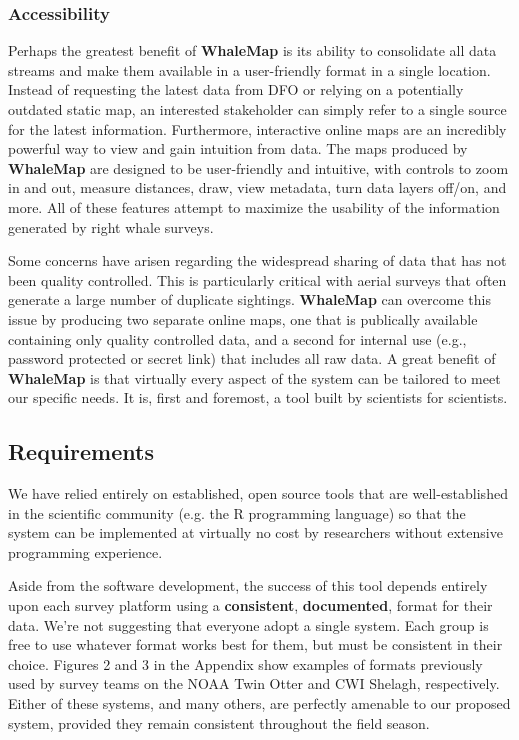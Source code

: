 \documentclass[11pt, letterpaper]{article}
\begin{document}
\subsubsection{Accessibility}

Perhaps the greatest benefit of \textbf{WhaleMap} is its ability to consolidate all data streams and make them available in a user-friendly format in a single location. Instead of requesting the latest data from DFO or relying on a potentially outdated static map, an interested stakeholder can simply refer to a single source for the latest information. Furthermore, interactive online maps are an incredibly powerful way to view and gain intuition from data. The maps produced by \textbf{WhaleMap} are designed to be user-friendly and intuitive, with controls to zoom in and out, measure distances, draw, view metadata, turn data layers off/on, and more. All of these features attempt to maximize the usability of the information generated by right whale surveys. 

Some concerns have arisen regarding the widespread sharing of data that has not been quality controlled. This is particularly critical with aerial surveys that often generate a large number of duplicate sightings. \textbf{WhaleMap} can overcome this issue by producing two separate online maps, one that is publically available containing only quality controlled data, and a second for internal use (e.g., password protected or secret link) that includes all raw data. A great benefit of \textbf{WhaleMap} is that virtually every aspect of the system can be tailored to meet our specific needs. It is, first and foremost, a tool built by scientists for scientists. 

\subsection{Requirements}

We have relied entirely on established, open source tools that are well-established in the scientific community (e.g. the R programming language) so that the system can be implemented at virtually no cost by researchers without extensive programming experience.

Aside from the software development, the success of this tool depends entirely upon each survey platform using a \textbf{consistent}, \textbf{documented}, format for their data. We're not suggesting that everyone adopt a single system. Each group is free to use whatever format works best for them, but must be consistent in their choice. Figures 2 and 3 in the Appendix show examples of formats previously used by survey teams on the NOAA Twin Otter and CWI Shelagh, respectively. Either of these systems, and many others, are perfectly amenable to our proposed system, provided they remain consistent throughout the field season.
\end{document}
